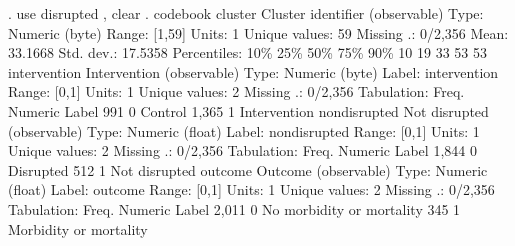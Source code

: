 . use disrupted , clear
{\smallskip}
. codebook
{\smallskip}
cluster                                          Cluster identifier (observable)
{\smallskip}
                  Type: Numeric (byte)
{\smallskip}
                 Range: [1,59]                        Units: 1
         Unique values: 59                        Missing .: 0/2,356
{\smallskip}
                  Mean: 33.1668
             Std. dev.: 17.5358
{\smallskip}
           Percentiles:     10\%       25\%       50\%       75\%       90\%
                             10        19        33        53        53
{\smallskip}
intervention                                           Intervention (observable)
{\smallskip}
                  Type: Numeric (byte)
                 Label: intervention
{\smallskip}
                 Range: [0,1]                         Units: 1
         Unique values: 2                         Missing .: 0/2,356
{\smallskip}
            Tabulation: Freq.   Numeric  Label
                          991         0  Control
                        1,365         1  Intervention
{\smallskip}
nondisrupted                                          Not disrupted (observable)
{\smallskip}
                  Type: Numeric (float)
                 Label: nondisrupted
{\smallskip}
                 Range: [0,1]                         Units: 1
         Unique values: 2                         Missing .: 0/2,356
{\smallskip}
            Tabulation: Freq.   Numeric  Label
                        1,844         0  Disrupted
                          512         1  Not disrupted
{\smallskip}
outcome                                                     Outcome (observable)
{\smallskip}
                  Type: Numeric (float)
                 Label: outcome
{\smallskip}
                 Range: [0,1]                         Units: 1
         Unique values: 2                         Missing .: 0/2,356
{\smallskip}
            Tabulation: Freq.   Numeric  Label
                        2,011         0  No morbidity or mortality
                          345         1  Morbidity or mortality
